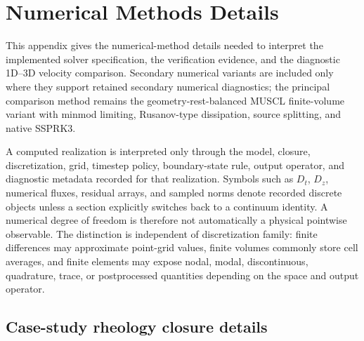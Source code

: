 \section{Numerical Methods Details}
\label{app:numerical-methods-details}
This appendix gives the numerical-method details needed to interpret the
implemented solver specification, the verification evidence, and the diagnostic
1D--3D velocity comparison. Secondary numerical variants are included only where
they support retained secondary numerical diagnostics; the principal comparison
method remains the geometry-rest-balanced MUSCL finite-volume variant with
minmod limiting, Rusanov-type dissipation, source splitting, and native SSPRK3.

\begin{convention}
\label{conv:computed-realization-record}
A computed realization is interpreted only through the model, closure,
discretization, grid, timestep policy, boundary-state rule, output operator, and
diagnostic metadata recorded for that realization. Symbols such as $D_t$, $D_z$,
numerical fluxes, residual arrays, and sampled norms denote recorded discrete
objects unless a section explicitly switches back to a continuum identity.
A numerical degree of freedom is therefore not automatically a physical
pointwise observable. The distinction is independent of discretization family:
finite differences may approximate point-grid values, finite volumes commonly
store cell averages, and finite elements may expose nodal, modal,
discontinuous, quadrature, trace, or postprocessed quantities depending on the
space and output operator.
\end{convention}

\subsection{Case-study rheology closure details}
\label{app:num-rheology-descriptor-details}

